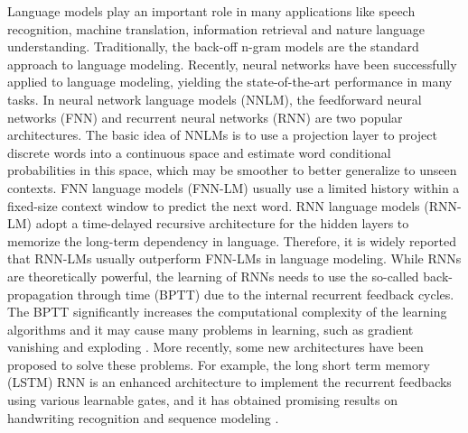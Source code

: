 \documentclass[11pt]{article}
\begin{document}
Language models play an important role in many applications like speech recognition, machine translation, information retrieval and nature language understanding. Traditionally, the back-off n-gram  models \cite{Katz.1987,Kneser.1995} are the standard approach to language modeling. Recently, neural networks have been successfully applied to language modeling, yielding the state-of-the-art performance in many tasks. In neural network language models (NNLM), the feedforward neural networks (FNN) and recurrent neural networks (RNN) \cite{Elman1990} are two popular architectures. The basic idea of NNLMs is to use a projection layer to project discrete words into a continuous space and estimate word conditional probabilities in this space, which may be smoother to better generalize to unseen contexts. FNN language models (FNN-LM) \cite{Bengio2001,Bengio2003} usually use a limited history within a fixed-size context window to predict the next word. RNN language models (RNN-LM) \cite{Mikolov2010recurrent,Mikolov2012} adopt a time-delayed recursive architecture for the hidden layers to memorize the long-term dependency in language. Therefore, it is widely reported that RNN-LMs usually outperform FNN-LMs in language modeling.  While RNNs are theoretically powerful, the learning of RNNs needs to use the so-called back-propagation through time (BPTT) \cite{Werbos1990} due to the internal recurrent feedback cycles. The BPTT significantly increases the computational complexity of the learning algorithms and it may cause many problems in learning, such as gradient vanishing and exploding \cite{Bengio1994}. More recently, some new architectures have been proposed to solve these problems. For example, the long short term memory (LSTM) RNN \cite{Hochreiter1997} is an enhanced architecture to implement the recurrent feedbacks using various learnable gates, and it has obtained promising results on handwriting recognition \cite{Graves2009} and sequence modeling \cite{Graves2013}. 
\end{document}
